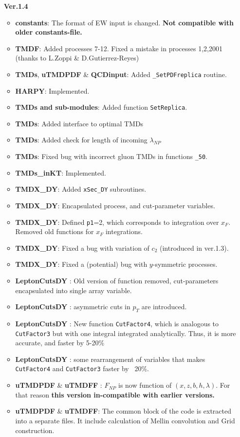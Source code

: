 \documentclass[prd,nofootinbib,eqsecnum,final]{revtex4}
\renewcommand{\(}{\left(}
\renewcommand{\)}{\right)}
\renewcommand{\[}{\left[}
\renewcommand{\]}{\right]}
\begin{document}
\begin{itemize}
\item[\textbf{Ver.1.4}]
\begin{itemize}
\item \textbf{constants}: The format of EW input is changed. \textbf{Not compatible with older constants-file.}
\item \textbf{TMDF}: Added processes 7-12. Fixed a mistake in processes 1,2,2001 (thanks to L.Zoppi \& D.Gutierrez-Reyes)
\item \textbf{TMDs}, \textbf{uTMDPDF} \& \textbf{QCDinput}: Added \texttt{\_SetPDFreplica} routine.
\item \textbf{HARPY}: Implemented.
\item \textbf{TMDs and sub-modules}: Added function \texttt{SetReplica}.
\item \textbf{TMDs}: Added interface to optimal TMDs
\item \textbf{TMDs}: Added check for length of incoming $\lambda_{NP}$
\item \textbf{TMDs}: Fixed bug with incorrect gluon TMDs in functions \texttt{\_50}.
\item \textbf{TMDs\_inKT}: Implemented.
\item \textbf{TMDX{\_}DY}: Added \texttt{xSec\_DY} subroutines.
\item \textbf{TMDX{\_}DY}: Encapsulated process, and cut-parameter variables. 
\item \textbf{TMDX{\_}DY}: Defined \texttt{p1}=2, which corresponds to integration over $x_F$. Removed old functions for $x_F$ integrations.
\item \textbf{TMDX{\_}DY}: Fixed a bug with variation of $c_2$ (introduced in ver.1.3).
\item \textbf{TMDX{\_}DY}: Fixed a (potential) bug with $y$-symmetric processes.
\item \textbf{LeptonCutsDY} : Old version of function removed, cut-parameters encapsulated into single array variable.
\item \textbf{LeptonCutsDY} : asymmetric cuts in $p_T$ are introduced.
\item \textbf{LeptonCutsDY} : New function \texttt{CutFactor4}, which is analogous to \texttt{CutFactor3} but with one integral integrated analytically. Thus, it is more accurate, and faster by 5-20\%
\item \textbf{LeptonCutsDY} : some rearrangement of variables that makes \texttt{CutFactor4} and \texttt{CutFactor3} faster by ~20\%.
\item \textbf{uTMDPDF} \& \textbf{uTMDFF} : $F_{NP}$ is now function of $(x,z,b,h,\lambda)$. For that reason \textbf{this version in-compatible with earlier versions.}
\item \textbf{uTMDPDF} \& \textbf{uTMDFF}: The common block of the code is extracted into a separate files. It include calculation of Mellin convolution and Grid construction.
\end{itemize}


\end{itemize}
\end{document}

